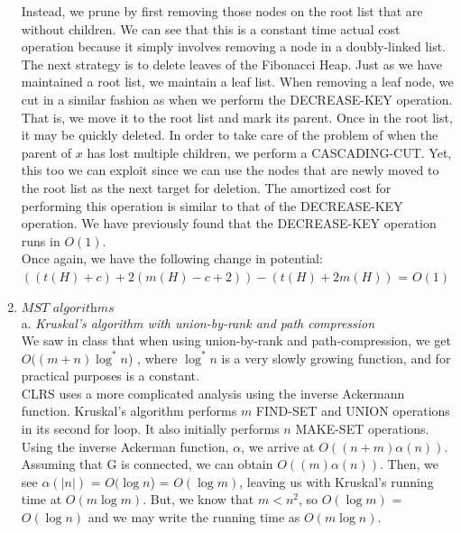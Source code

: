 \documentclass[]{report}
\begin{document}
\begin{enumerate}
	 Instead, we prune by first removing those nodes on the root list that are without children. We can see that this is a constant time actual cost operation because it simply involves removing a node in a doubly-linked list. The next strategy is to delete leaves of the Fibonacci Heap. Just as we have maintained a root list, we maintain a leaf list. When removing a leaf node, we cut in a similar fashion as when we perform the DECREASE-KEY operation. That is, we move it to the root list and mark its parent. Once in the root list, it may be quickly deleted. In order to take care of the problem of when the parent of $ x $ has lost multiple children, we perform a CASCADING-CUT. Yet, this too we can exploit since we can use the nodes that are newly moved to the root list as the next target for deletion. The amortized cost for performing this operation is similar to that of the DECREASE-KEY operation. We have previously found that the DECREASE-KEY operation runs in $ O(1) $.\\
	 
	Once again, we have the following change in potential: \\
	$ (     (t(H) + c ) + 2(m(H)  - c + 2))  -  (t(H) + 2m(H) )  $ = $  O(1) $ \\
	 
	 	 
	 \item $ \textit{MST algorithms} $ \\
	 
	 a. \textit{Kruskal's algorithm with union-by-rank and path compression} \\
	 
	 We saw in class that when using union-by-rank and path-compression, we get $O((m+n) \log^{*} n$) , where $\log^{*} n$ is a very slowly growing function, and for practical purposes is a constant. \\
	 
	 CLRS uses a more complicated analysis using the inverse Ackermann function. Kruskal's algorithm performs $ m $ FIND-SET and UNION operations in its second for loop. It also initially performs $ n $ MAKE-SET operations. Using the inverse Ackerman function, $\alpha$, we arrive at $ O((n+m)\alpha(n) )$. Assuming that G is connected, we can obtain $ O((m)\alpha(n) )$. Then, we see $ \alpha(|n|) $ = $ O(\log n$) = $ O(\log m)$, leaving us with Kruskal's running time at $ O(m \log m) $. But, we know that $ m < n^{2} $, so $ O( \log m)$ = $ O(\log n)$ and we may write the running time as $ O(m\log n) $. \\
	 

\end{enumerate}
\end{document}

